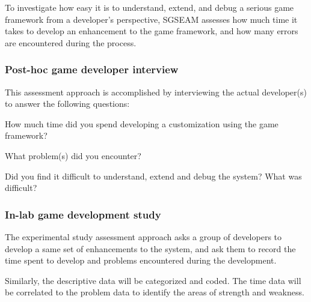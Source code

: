 \documentclass[11pt]{article}
\begin{document}
To investigate how easy it is to understand, extend, and debug a serious game
framework from a developer's perspective, SGSEAM assesses how much time it takes to develop an
enhancement to the game framework, and how many errors are encountered
during the process.

\subsubsection{Post-hoc game developer interview}
\label{Post-hoc game developer interview}

This assessment approach is accomplished by interviewing the actual developer(s) to
answer the following questions:\\
 
\begin{compactitem}
\item How much time did you spend developing a customization using the game framework?
\item What problem(s) did you encounter?
\item Did you find it difficult to understand, extend and debug the system? What was difficult?\\
\end{compactitem}

\subsubsection{In-lab game development study}
\label{In-lab game development study}

The experimental study assessment approach asks a group of developers to develop a same set of
enhancements to the system, and ask them to record the time spent to develop and problems
encountered during the development.

Similarly, the descriptive data will be categorized and coded. The time data will be correlated to the problem data to identify the areas of strength and weakness.



\end{document}
